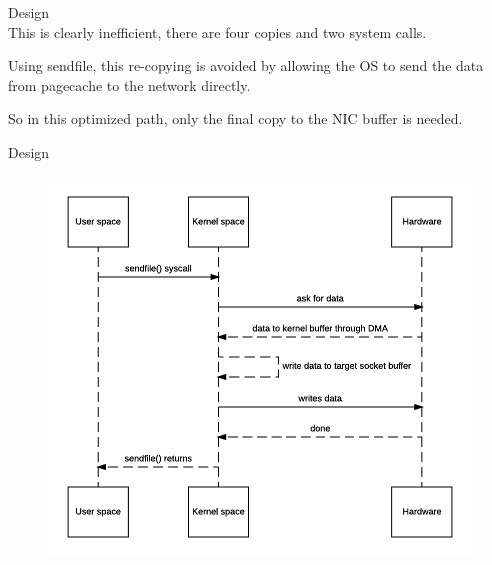 \begin{frame}[plain,t]{Design} %
     \\
    \vspace{2ex}
    This is clearly inefficient, there are four copies and two system calls. 
    
    \vspace{2ex}
    Using sendfile, this re-copying is avoided by allowing the OS to send the data from pagecache to the network directly. 
    
    \vspace{2ex}
    So in this optimized path, only the final copy to the NIC buffer is needed.
    
\end{frame}
\begin{frame}[plain,t]{Design} %
     \\
    \vspace{-1ex}
    \begin{figure}
        \centering
        \includegraphics[width=0.7\linewidth]{image/0202}
        \label{fig:0202}
    \end{figure}
    
    
\end{frame}


